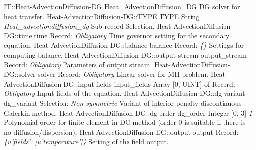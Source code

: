 \begin{RecordType}
	{IT::Heat-AdvectionDiffusion-DG}
	{Heat{\_}AdvectionDiffusion{\_}DG}
	{} %
	{} %
	{{{DG solver for heat transfer.}}}
		\RecKey
			{Heat-AdvectionDiffusion-DG::TYPE}
			{TYPE}
			{{String}}
			{ \it{Heat{\_}advectiondiffusion{\_}dg} }
			{{{Sub-record Selection.}}}
		\RecKey
			{Heat-AdvectionDiffusion-DG::time}
			{time}
			{{Record}{: }}
			{ \it{Obligatory} }
			{{{Time governor setting for the secondary equation.}}}
		\RecKey
			{Heat-AdvectionDiffusion-DG::balance}
			{balance}
			{{Record}{: }}
			{ \it{{\{}{\}}} }
			{{{Settings for computing balance.}}}
		\RecKey
			{Heat-AdvectionDiffusion-DG::output-stream}
			{output{\_}stream}
			{{Record}{: }}
			{ \it{Obligatory} }
			{{{Parameters of output stream.}}}
		\RecKey
			{Heat-AdvectionDiffusion-DG::solver}
			{solver}
			{{Record}{: }}
			{ \it{Obligatory} }
			{{{Linear solver for MH problem.}}}
		\RecKey
			{Heat-AdvectionDiffusion-DG::input-fields}
			{input{\_}fields}
			{{Array [0, UINT] of }{Record}{: }}
			{ \it{Obligatory} }
			{{{Input fields of the equation.}}}
		\RecKey
			{Heat-AdvectionDiffusion-DG::dg-variant}
			{dg{\_}variant}
			{{Selection}{: }}
			{ \it{Non-symmetric} }
			{{{Variant of interior penalty discontinuous Galerkin method.}}}
		\RecKey
			{Heat-AdvectionDiffusion-DG::dg-order}
			{dg{\_}order}
			{{Integer [0, 3]}}
			{ \it{1} }
			{{{Polynomial order for finite element in DG method (order 0 is suitable if there is no diffusion/dispersion).}}}
		\RecKey
			{Heat-AdvectionDiffusion-DG::output}
			{output}
			{{Record}{: }}
			{ \it{{\{}u'fields': [u'temperature']{\}}} }
			{{{Setting of the field output.}}}
\end{RecordType}
